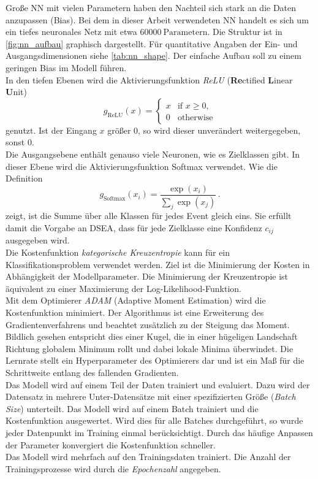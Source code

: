 Große NN mit vielen Parametern haben den Nachteil sich stark an die Daten anzupassen (Bias).
Bei dem in dieser Arbeit verwendeten NN handelt es sich um ein tiefes neuronales Netz mit etwa $\SI{60000}{\text{Parametern}}$.
Die Struktur ist in \autoref{fig:nn_aufbau} graphisch dargestellt.
Für quantitative Angaben der Ein- und Ausgangsdimensionen siehe \autoref{tab:nn_shape}.
Der einfache Aufbau soll zu einem geringen Bias im Modell führen.
\\
In den tiefen Ebenen wird die Aktivierungsfunktion \textit{ReLU} (\textbf{Re}ctified \textbf{L}inear \textbf{U}nit)
\begin{equation*}
    g_\text{ReLU}(x)=
        \begin{cases}
            x & {\text{if }} x \geq 0,\\
            0 & {\text{otherwise}}
        \end{cases}
\end{equation*}
genutzt.
Ist der Eingang $x$ größer 0, so wird dieser unverändert weitergegeben, sonst 0.
\\
Die Ausgangsebene enthält genauso viele Neuronen, wie es Zielklassen gibt.
In dieser Ebene wird die Aktivierungsfunktion Softmax verwendet.
Wie die Definition
\begin{equation*}
    g_\text{Softmax}(x_i) = \frac{\exp(x_i)}{\sum_j \exp(x_j)} \, .
\end{equation*}
zeigt, ist die Summe über alle Klassen für jedes Event gleich eins.
Sie erfüllt damit die Vorgabe an DSEA, dass für jede Zielklasse eine Konfidenz $c_{ij}$ ausgegeben wird.
\\
Die Kostenfunktion \textit{kategorische Kreuzentropie}\cite{cross_entropy} kann für ein Klassifikationsproblem verwendet werden.
Ziel ist die Minimierung der Kosten in Abhängigkeit der Modellparameter.
Die Minimierung der Kreuzentropie ist äquivalent zu einer Maximierung der Log-Likelihood-Funktion.
\\
Mit dem Optimierer \textit{ADAM} (Adaptive Moment Estimation)\cite{ADAM} wird die Kostenfunktion minimiert.
Der Algorithmus ist eine Erweiterung des Gradientenverfahrens und beachtet zusätzlich zu der Steigung das Moment.
Bildlich gesehen entspricht dies einer Kugel, die in einer hügeligen Landschaft Richtung globalem Minimum rollt und dabei lokale Minima überwindet.
Die Lernrate stellt ein Hyperparameter des Optimierers dar und ist ein Maß für die Schrittweite entlang des fallenden Gradienten.
\\
Das Modell wird auf einem Teil der Daten trainiert und evaluiert.
Dazu wird der Datensatz in mehrere Unter-Datensätze mit einer spezifizierten Größe (\textit{Batch Size})\cite{brownlee2018difference} unterteilt.
Das Modell wird auf einem Batch trainiert und die Kostenfunktion ausgewertet.
Wird dies für alle Batches durchgeführt, so wurde jeder Datenpunkt im Training einmal berücksichtigt.
Durch das häufige Anpassen der Parameter konvergiert die Kostenfunktion schneller.
\\
Das Modell wird mehrfach auf den Trainingsdaten trainiert.
Die Anzahl der Trainingsprozesse wird durch die \textit{Epochenzahl}\cite{brownlee2018difference} angegeben.